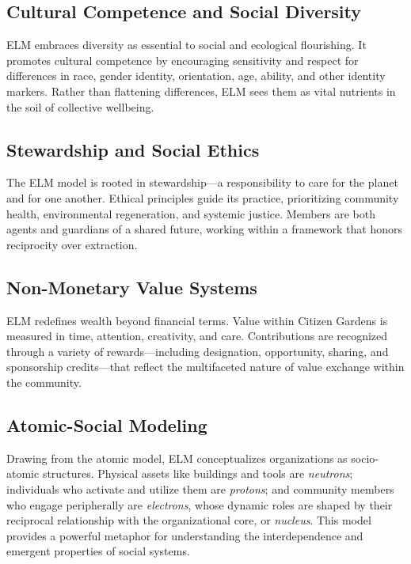 \documentclass[12pt]{article}
\begin{document}
\subsection{Cultural Competence and Social Diversity}

ELM embraces diversity as essential to social and ecological flourishing. It promotes cultural competence by encouraging sensitivity and respect for differences in race, gender identity, orientation, age, ability, and other identity markers. Rather than flattening differences, ELM sees them as vital nutrients in the soil of collective wellbeing.

\subsection{Stewardship and Social Ethics}

The ELM model is rooted in stewardship---a responsibility to care for the planet and for one another. Ethical principles guide its practice, prioritizing community health, environmental regeneration, and systemic justice. Members are both agents and guardians of a shared future, working within a framework that honors reciprocity over extraction.

\subsection{Non-Monetary Value Systems}

ELM redefines wealth beyond financial terms. Value within Citizen Gardens is measured in time, attention, creativity, and care. Contributions are recognized through a variety of rewards---including designation, opportunity, sharing, and sponsorship credits---that reflect the multifaceted nature of value exchange within the community.

\subsection{Atomic-Social Modeling}

Drawing from the atomic model, ELM conceptualizes organizations as socio-atomic structures. Physical assets like buildings and tools are \textit{neutrons}; individuals who activate and utilize them are \textit{protons}; and community members who engage peripherally are \textit{electrons}, whose dynamic roles are shaped by their reciprocal relationship with the organizational core, or \textit{nucleus}. This model provides a powerful metaphor for understanding the interdependence and emergent properties of social systems.
\end{document}
